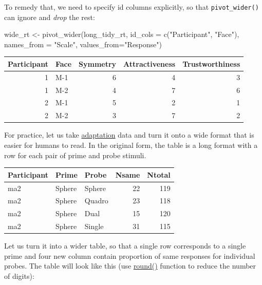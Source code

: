 \documentclass[
]{book}
\newenvironment{Shaded}{\begin{snugshade}}{\end{snugshade}}
\newcommand{\AttributeTok}[1]{\textcolor[rgb]{0.77,0.63,0.00}{#1}}
\newcommand{\FunctionTok}[1]{\textcolor[rgb]{0.00,0.00,0.00}{#1}}
\newcommand{\NormalTok}[1]{#1}
\newcommand{\OtherTok}[1]{\textcolor[rgb]{0.56,0.35,0.01}{#1}}
\newcommand{\StringTok}[1]{\textcolor[rgb]{0.31,0.60,0.02}{#1}}
\begin{document}
To remedy that, we need to specify id columns explicitly, so that \texttt{pivot\_wider()} can ignore and \emph{drop} the rest:

\begin{Shaded}
\begin{Highlighting}[]
\NormalTok{wide\_rt }\OtherTok{\textless{}{-}}
  \FunctionTok{pivot\_wider}\NormalTok{(long\_tidy\_rt,}
              \AttributeTok{id\_cols =} \FunctionTok{c}\NormalTok{(}\StringTok{"Participant"}\NormalTok{, }\StringTok{"Face"}\NormalTok{),}
              \AttributeTok{names\_from =} \StringTok{"Scale"}\NormalTok{,}
              \AttributeTok{values\_from=}\StringTok{"Response"}\NormalTok{) }
\end{Highlighting}
\end{Shaded}

\begin{tabular}{r|l|r|r|r}
\hline
Participant & Face & Symmetry & Attractiveness & Trustworthiness\\
\hline
1 & M-1 & 6 & 4 & 3\\
\hline
1 & M-2 & 4 & 7 & 6\\
\hline
2 & M-1 & 5 & 2 & 1\\
\hline
2 & M-2 & 3 & 7 & 2\\
\hline
\end{tabular}

For practice, let us take \href{data/bands-adaptation.csv}{adaptation} data and turn it onto a wide format that is easier for humans to read. In the original form, the table is a long format with a row for each pair of prime and probe stimuli.

\begin{tabular}{l|l|l|r|r}
\hline
Participant & Prime & Probe & Nsame & Ntotal\\
\hline
ma2 & Sphere & Sphere & 22 & 119\\
\hline
ma2 & Sphere & Quadro & 23 & 118\\
\hline
ma2 & Sphere & Dual & 15 & 120\\
\hline
ma2 & Sphere & Single & 31 & 115\\
\hline
\end{tabular}

Let us turn it into a wider table, so that a single row corresponds to a single prime and four new column contain proportion of same responses for individual probes. The table will look like this (use \href{https://stat.ethz.ch/R-manual/R-devel/library/base/html/Round.html}{round()} function to reduce the number of digits):
\end{document}
